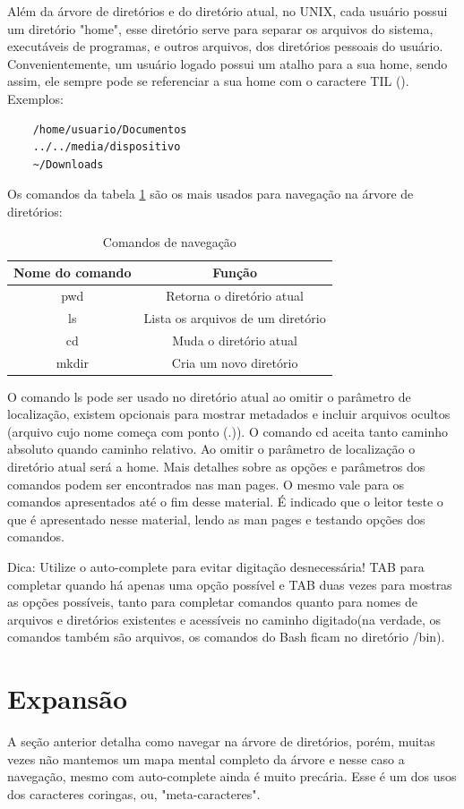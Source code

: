 \documentclass[oneside, 11 pt]{article}
\begin{document}
	Além da árvore de diretórios e do diretório atual, no UNIX, cada usuário possui um diretório "home", esse diretório serve para separar os arquivos do sistema, executáveis de programas, e outros arquivos, dos diretórios pessoais do usuário. Convenientemente, um usuário logado possui um atalho para a sua home, sendo assim, ele sempre pode se referenciar a sua home com o caractere TIL (\texttildelow).
	Exemplos: 
	\begin{lstlisting}
	/home/usuario/Documentos
	../../media/dispositivo
	~/Downloads
	\end{lstlisting}
	Os comandos da tabela \ref{table:1} são os mais usados para navegação na árvore de diretórios:
	
	\begin{table}[!ht]
		\centering
		\begin{tabular}{ | c | c | } 
			\hline
			\bfseries Nome do comando & \bfseries Função \\
			\hline
			pwd & Retorna o diretório atual \\
			\hline
			ls & Lista os arquivos de um diretório \\
			\hline
			cd & Muda o diretório atual \\
			\hline
			mkdir & Cria um novo diretório \\
			\hline
		\end{tabular}
		\caption{Comandos de navegação}
		\label{table:1}
	\end{table}
	O comando ls pode ser usado no diretório atual ao omitir o parâmetro de localização, existem opcionais para mostrar metadados e incluir arquivos ocultos (arquivo cujo nome começa com ponto (.)). O comando cd aceita tanto caminho absoluto quando caminho relativo. Ao omitir o parâmetro de localização o diretório atual será a home. Mais detalhes sobre as opções e parâmetros dos comandos podem ser encontrados nas man pages. O mesmo vale para os comandos apresentados até o fim desse material. É indicado que o leitor teste o que é apresentado nesse material, lendo as man pages e testando opções dos comandos.
	
	Dica: Utilize o auto-complete para evitar digitação desnecessária! TAB para completar quando há apenas uma opção possível e TAB duas vezes para mostras as opções possíveis, tanto para completar comandos quanto para nomes de arquivos e diretórios existentes e acessíveis no caminho digitado(na verdade, os comandos também são arquivos, os comandos do Bash ficam no diretório /bin).
	\section{Expansão}
	A seção anterior detalha como navegar na árvore de diretórios, porém, muitas vezes não mantemos um mapa mental completo da árvore e nesse caso a navegação, mesmo com auto-complete ainda é muito precária. Esse é um dos usos dos caracteres coringas, ou, "meta-caracteres".
	
\end{document}
